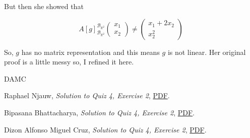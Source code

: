 \documentclass{article}
\theoremstyle{definition}
\begin{document}
But then she showed that 

$$
A[g]_{\mathcal{B}_{\mathbb{R}^2}}^{\mathcal{B}_{\mathbb{R}^2}} 
\begin{pmatrix}
    x_1\\
    x_2
\end{pmatrix}
\neq
\begin{pmatrix}
    x_1+2x_2\\
    x_2^2
\end{pmatrix}
$$

So, $g$ has no matrix representation and this means $g$ is not linear. Her original proof is a little messy so, I refined it here. 

\begin{thebibliography}{DAMC}

 Raphael Njauw, \emph{Solution to Quiz 4, Exercise 2}, \href{https://www.atraj.it/pdfs/Teaching/TA/Linear%20ALgebra%20I%20and%20Mathematics%20Tutorial%201b/quiz4-linear-maps/Raphael_Njauw_Exercise2.pdf}{PDF}.

 Bipasana Bhattacharya, \emph{Solution to Quiz 4, Exercise 2}, \href{https://www.atraj.it/pdfs/Teaching/TA/Linear%20ALgebra%20I%20and%20Mathematics%20Tutorial%201b/quiz4-linear-maps/Bipasana_Exercise2.pdf}{PDF}.

 Dizon Alfonso Miguel Cruz, \emph{Solution to Quiz 4, Exercise 2}, \href{https://www.atraj.it/pdfs/Teaching/TA/Linear%20ALgebra%20I%20and%20Mathematics%20Tutorial%201b/quiz4-linear-maps/Dizon_Alfonso_Miguel_Cruz_Exercise2.pdf}{PDF}.

\end{thebibliography}
\end{document}
